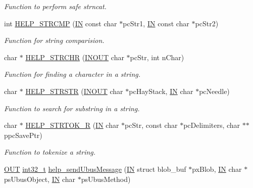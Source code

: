 \begin{DoxyCompactItemize}
\begin{DoxyCompactList}\small\item\em Function to perform safe strncat. \end{DoxyCompactList}\item 
int \hyperlink{group__LIBHELP_gac08fb726326e0ccf6dff05f97c251b93}{H\-E\-L\-P\-\_\-\-S\-T\-R\-C\-M\-P} (\hyperlink{group__LIBHELP_gac2bbd6d630a06a980d9a92ddb9a49928}{I\-N} const char $\ast$pc\-Str1, \hyperlink{group__LIBHELP_gac2bbd6d630a06a980d9a92ddb9a49928}{I\-N} const char $\ast$pc\-Str2)
\begin{DoxyCompactList}\small\item\em Function for string comparision. \end{DoxyCompactList}\item 
char $\ast$ \hyperlink{group__LIBHELP_gac0126ae1cda6789711a261d98607dc7a}{H\-E\-L\-P\-\_\-\-S\-T\-R\-C\-H\-R} (\hyperlink{group__LIBHELP_ga62766f3ea8784d1db62df989f8f33d2d}{I\-N\-O\-U\-T} char $\ast$pc\-Str, int n\-Char)
\begin{DoxyCompactList}\small\item\em Function for finding a character in a string. \end{DoxyCompactList}\item 
char $\ast$ \hyperlink{group__LIBHELP_gaf5844e281e1aaceb45769c5e891aebdd}{H\-E\-L\-P\-\_\-\-S\-T\-R\-S\-T\-R} (\hyperlink{group__LIBHELP_ga62766f3ea8784d1db62df989f8f33d2d}{I\-N\-O\-U\-T} char $\ast$pc\-Hay\-Stack, \hyperlink{group__LIBHELP_gac2bbd6d630a06a980d9a92ddb9a49928}{I\-N} char $\ast$pc\-Needle)
\begin{DoxyCompactList}\small\item\em Function to search for substring in a string. \end{DoxyCompactList}\item 
char $\ast$ \hyperlink{group__LIBHELP_ga836960ef80323486284e33eff0b4cc53}{H\-E\-L\-P\-\_\-\-S\-T\-R\-T\-O\-K\-\_\-\-R} (\hyperlink{group__LIBHELP_gac2bbd6d630a06a980d9a92ddb9a49928}{I\-N} char $\ast$pc\-Str, const char $\ast$pc\-Delimiters, char $\ast$$\ast$ppc\-Save\-Ptr)
\begin{DoxyCompactList}\small\item\em Function to tokenize a string. \end{DoxyCompactList}\item 
\hyperlink{group__LIBHELP_gaec78e7a9e90a406a56f859ee456e8eae}{O\-U\-T} \hyperlink{commondefs_8h_a32f2e37ee053cf2ce8ca28d1f74630e5}{int32\-\_\-t} \hyperlink{group__LIBHELP_ga58565b7c016691926c9934bb01d229d2}{help\-\_\-send\-Ubus\-Message} (\hyperlink{group__LIBHELP_gac2bbd6d630a06a980d9a92ddb9a49928}{I\-N} struct blob\-\_\-buf $\ast$px\-Blob, \hyperlink{group__LIBHELP_gac2bbd6d630a06a980d9a92ddb9a49928}{I\-N} char $\ast$ps\-Ubus\-Object, \hyperlink{group__LIBHELP_gac2bbd6d630a06a980d9a92ddb9a49928}{I\-N} char $\ast$ps\-Ubus\-Method)
$$
\end{DoxyCompactItemize}
